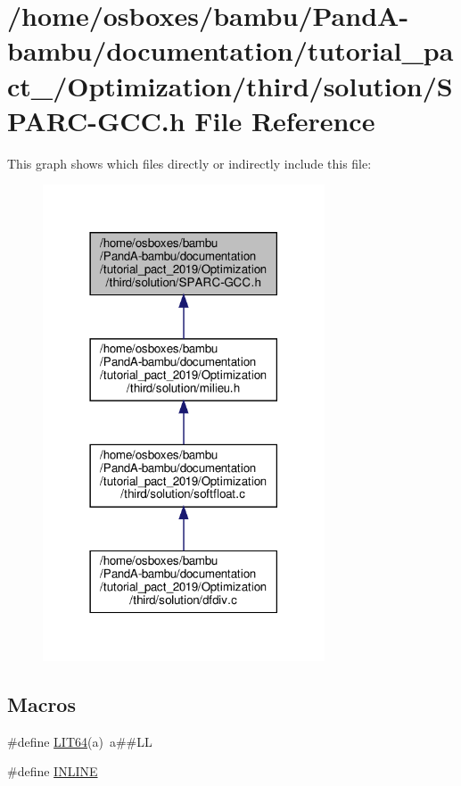 \hypertarget{tutorial__pact__2019_2Optimization_2third_2solution_2SPARC-GCC_8h}{}\section{/home/osboxes/bambu/\+Pand\+A-\/bambu/documentation/tutorial\+\_\+pact\+\_/\+Optimization/third/solution/\+S\+P\+A\+R\+C-\/\+G\+CC.h File Reference}
\label{tutorial__pact__2019_2Optimization_2third_2solution_2SPARC-GCC_8h}
This graph shows which files directly or indirectly include this file\+:
\nopagebreak
\begin{figure}[H]
\begin{center}
\leavevmode
\includegraphics[width=237pt]{dc/d54/tutorial__pact__2019_2Optimization_2third_2solution_2SPARC-GCC_8h__dep__incl}
\end{center}
\end{figure}
\subsection*{Macros}
\begin{DoxyCompactItemize}
\item 
\#define \hyperlink{tutorial__pact__2019_2Optimization_2third_2solution_2SPARC-GCC_8h_a575f5a619c8e7d71c338c70a2b4e25a5}{L\+I\+T64}(a)~a\#\#LL
\item 
\#define \hyperlink{tutorial__pact__2019_2Optimization_2third_2solution_2SPARC-GCC_8h_a2eb6f9e0395b47b8d5e3eeae4fe0c116}{I\+N\+L\+I\+NE}
\end{DoxyCompactItemize}

